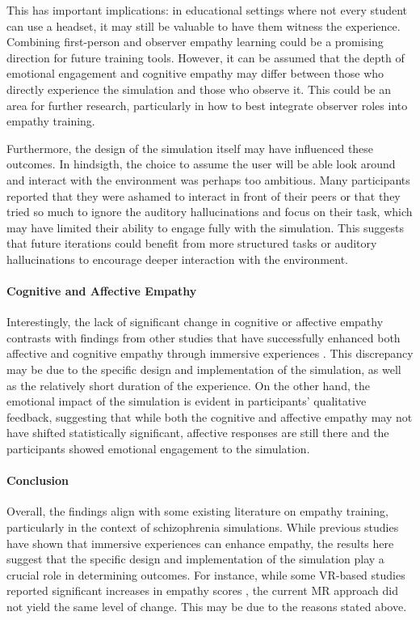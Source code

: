This has important implications: in educational settings where not every student can use a headset, it may still be valuable to have them witness the experience. Combining first-person and observer empathy learning could be a promising direction for future training tools. However, it can be assumed that the depth of emotional engagement and cognitive empathy may differ between those who directly experience the simulation and those who observe it. This could be an area for further research, particularly in how to best integrate observer roles into empathy training. 

\vspace{1em}

Furthermore, the design of the simulation itself may have influenced these outcomes. In hindsigth, the choice to assume the user will be able look around and interact with the environment was perhaps too ambitious. Many participants reported that they were ashamed to interact in front of their peers or that they tried so much to ignore the auditory hallucinations and focus on their task, which may have limited their ability to engage fully with the simulation. This suggests that future iterations could benefit from more structured tasks or auditory hallucinations to encourage deeper interaction with the environment.

\paragraph{Cognitive and Affective Empathy}
Interestingly, the lack of significant change in cognitive or affective empathy contrasts with findings from other studies that have successfully enhanced both affective and cognitive empathy through immersive experiences \cite{Rueda2020, Ando2011}. This discrepancy may be due to the specific design and implementation of the simulation, as well as the relatively short duration of the experience. On the other hand, the emotional impact of the simulation is evident in participants' qualitative feedback, suggesting that while both the cognitive and affective empathy may not have shifted statistically significant, affective responses are still there and the participants showed emotional engagement to the simulation.

\paragraph{Conclusion}
Overall, the findings align with some existing literature on empathy training, particularly in the context of schizophrenia simulations. While previous studies have shown that immersive experiences can enhance empathy, the results here suggest that the specific design and implementation of the simulation play a crucial role in determining outcomes. For instance, while some VR-based studies reported significant increases in empathy scores \cite{Martingano2021, Ventura2020}, the current MR approach did not yield the same level of change. This may be due to the reasons stated above.


